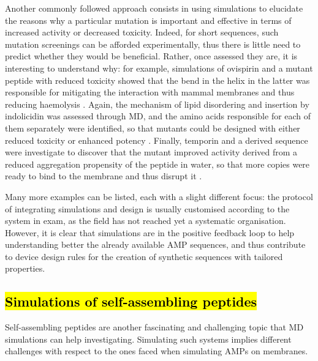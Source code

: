 Another commonly followed approach consists in using simulations to elucidate the reasons why a particular mutation is important and effective in terms of increased activity or decreased toxicity. Indeed, for short sequences, such mutation screenings can be afforded experimentally, thus there is little need to predict whether they would be beneficial. Rather, once assessed they are, it is interesting to understand why: for example, simulations of ovispirin and a mutant peptide with reduced toxicity showed that the bend in the helix in the latter was responsible for mitigating the interaction with mammal membranes and thus reducing haemolysis \cite{Khandelia2005}. Again, the mechanism of lipid disordering and insertion by indolicidin was assessed through MD, and the amino acids responsible for each of them separately were identified, so that mutants could be designed with either reduced toxicity or enhanced potency \cite{Tsai2009}. Finally, temporin and a derived sequence were investigate to discover that the mutant improved activity derived from a reduced aggregation propensity of the peptide in water, so that more copies were ready to bind to the membrane and thus disrupt it \cite{Farrotti2017}.

Many more examples can be listed, each with a slight different focus: the protocol of integrating simulations and design is usually customised according to the system in exam, as the field has not reached yet a systematic organisation.
%
However, it is clear that simulations are in the positive feedback loop to help understanding better the already available AMP sequences, and thus contribute to device design rules for the creation of synthetic sequences with tailored properties.


\subsection{\hl{Simulations of self-assembling peptides}}
Self-assembling peptides are another fascinating and challenging topic that MD simulations can help investigating. Simulating such systems implies different challenges with respect to the ones faced when simulating AMPs on membranes.

